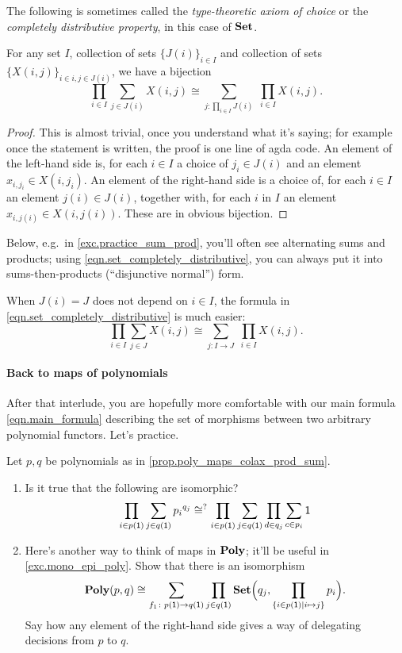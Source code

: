 \documentclass[DynamicalBook]{subfiles}
\begin{document}
The following is sometimes called the \emph{type-theoretic axiom of choice} or the \emph{completely distributive property}, in this case of $\textbf{Set}$.

\begin{proposition}
For any set $I$, collection of sets $\{J(i)\}_{i\in I}$ and collection of sets $\{X(i,j)\}_{i\in i, j\in J(i)}$, we have a bijection
\begin{equation}\label{eqn.set_completely_distributive}
\prod_{i\in I}\sum_{j\in J(i)}X(i,j)\cong\sum_{j\colon\prod_{i\in I}J(i)}\;\prod_{i\in I}X(i,j).
\end{equation}
\end{proposition}
\begin{proof}
This is almost trivial, once you understand what it's saying; for example once the statement is written, the proof is one line of agda code. An element of the left-hand side is, for each $i\in I$ a choice  of $j_i\in J(i)$ and an element $x_{i,j_i}\in X(i,j_i)$. An element of the right-hand side is a choice of, for each $i\in I$ an element $j(i)\in J(i)$, together with, for each $i$ in $I$ an element $x_{i,j(i)}\in X(i,j(i))$. These are in obvious bijection.
\end{proof}
Below, e.g.\ in \cref{exc.practice_sum_prod}, you'll often see alternating sums and products; using \cref{eqn.set_completely_distributive}, you can always put it into sums-then-products (``disjunctive normal'') form.

When $J(i)=J$ does not depend on $i\in I$, the formula in \eqref{eqn.set_completely_distributive} is much easier:
\[
\prod_{i\in I}\sum_{j\in J}X(i,j)\cong\sum_{j\colon I\to J}\;\prod_{i\in I}X(i,j).
\]

\paragraph{Back to maps of polynomials}
After that interlude, you are hopefully more comfortable with our main formula \cref{eqn.main_formula} describing the set of morphisms between two arbitrary polynomial functors. Let's practice.

\begin{exercise}\label{exc.practice_sum_prod}
Let $p,q$ be polynomials as in \cref{prop.poly_maps_colax_prod_sum}. 
\begin{enumerate}
\item Is it true that the following are isomorphic?
\[
  \prod_{i\in p(\textsf{1})}\sum_{j\in q(\textsf{1})}{p_i}^{q_j}
  \cong^?
  \prod_{i\in p(\textsf{1})}\sum_{j\in q(\textsf{1})}\prod_{d\in q_j}\sum_{c\in p_i}\textsf{1}
\]
\item Here's another way to think of maps in $\textbf{Poly}$; it'll be useful in \cref{exc.mono_epi_poly}. Show that there is an isomorphism
	\[
	\textbf{Poly}(p,q)\cong\sum_{f_1\colon p(\textsf{1})\to q(\textsf{1})}\prod_{j\in q(\textsf{1})}\textbf{Set}\Big(q_j,\prod_{\{i\in p(\textsf{1})\mid i\mapsto j\}}p_i\Big).
	\]
	Say how any element of the right-hand side gives a way of delegating decisions from $p$ to $q$.
\end{enumerate}
\end{exercise}
\end{document}
